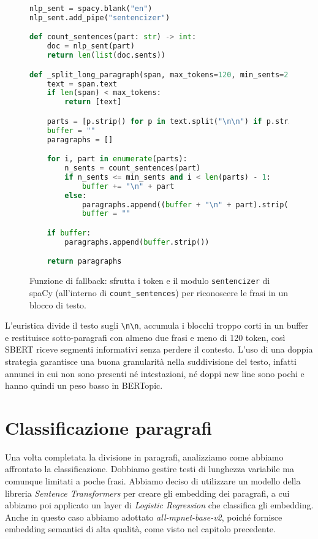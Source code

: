 \begin{figure}[H]
    \centering
    \scriptsize
\begin{lstlisting}[language=python]
nlp_sent = spacy.blank("en")
nlp_sent.add_pipe("sentencizer")

def count_sentences(part: str) -> int:
    doc = nlp_sent(part)
    return len(list(doc.sents))

def _split_long_paragraph(span, max_tokens=120, min_sents=2):
    text = span.text
    if len(span) < max_tokens:
        return [text]

    parts = [p.strip() for p in text.split("\n\n") if p.strip()]
    buffer = ""
    paragraphs = []

    for i, part in enumerate(parts):
        n_sents = count_sentences(part)
        if n_sents <= min_sents and i < len(parts) - 1:
            buffer += "\n" + part
        else:
            paragraphs.append((buffer + "\n" + part).strip())
            buffer = ""

    if buffer:
        paragraphs.append(buffer.strip())

    return paragraphs
\end{lstlisting}
    \caption{Funzione di fallback: sfrutta i token e il modulo \texttt{sentencizer} di spaCy (all'interno di \texttt{count\_sentences}) per riconoscere le frasi in un blocco di testo.}
    \label{fig:fallback-split}
\end{figure}

\noindent L'euristica divide il testo sugli \texttt{\textbackslash n\textbackslash n}, accumula i blocchi troppo corti in un buffer e restituisce sotto-paragrafi con almeno due frasi e meno di 120 token, così SBERT riceve segmenti informativi senza perdere il contesto.
L'uso di una doppia strategia garantisce una buona granularità nella suddivisione del testo, infatti annunci in cui non sono presenti né intestazioni, né doppi new line sono pochi e hanno quindi un peso basso in BERTopic.
\section{Classificazione paragrafi}

\noindent Una volta completata la divisione in paragrafi, analizziamo come abbiamo affrontato la classificazione. Dobbiamo gestire testi di lunghezza variabile ma comunque limitati a poche frasi. Abbiamo deciso di utilizzare un modello della libreria \textit{Sentence Transformers} per creare gli embedding dei paragrafi, a cui abbiamo poi applicato un layer di \textit{Logistic Regression} che classifica gli embedding. Anche in questo caso abbiamo adottato \textit{all-mpnet-base-v2}, poiché fornisce embedding semantici di alta qualità, come visto nel capitolo precedente.

